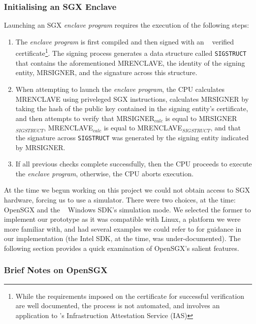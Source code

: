 \documentclass[../main.tex]{subfiles}
\begin{document}
\subsubsection{Initialising an SGX Enclave}

Launching an SGX \textit{enclave program} requires the execution of
the following steps:

\begin{enumerate}
  \item The \textit{enclave program} is first compiled and then signed
    with an \Intel~ verified certificate\footnote{While the requirements
    imposed on the certificate for successful verification are well
    documented, the process is not automated, and involves an application
    to \Intel's Infrastruction Attestation Service (IAS)}. The signing
    process generates a data structure called \texttt{SIGSTRUCT} that
    contains the aforementioned MRENCLAVE, the identity of the signing
    entity, MRSIGNER, and the signature across this structure.
  \item When attempting to launch the \textit{enclave program}, the
    CPU calculates MRENCLAVE using priveleged SGX instructions, calculates
    MRSIGNER by taking the hash of the public key contained in the signing
    entity's certificate, and then attempts to verify that
    MRSIGNER$_{calc}$ is equal to MRSIGNER$_{SIGSTRUCT}$,
    MRENCLAVE$_{calc}$ is equal to MRENCLAVE$_{SIGSTRUCT}$, and that the
    signature across \texttt{SIGSTRUCT} was generated by the signing
    entity indicated by MRSIGNER.
  \item If all previous checks complete successfully, then the CPU
    proceeds to execute the \textit{enclave program}, otherwise, the CPU
    aborts execution.
\end{enumerate}

At the time we begun working on this project we could not obtain
access to SGX hardware, forcing us to use a simulator. There were two
choices, at the time: OpenSGX and the \Intel~ Windows SDK's simulation
mode. We selected the former to implement our prototype as it was
compatible with Linux, a platform we were more familiar with, and had
several examples we could refer to for guidance in our implementation
(the Intel SDK, at the time, was under-documented). The following
section provides a quick examination of OpenSGX's salient features.


\subsubsection{Brief Notes on OpenSGX}

\end{document}

